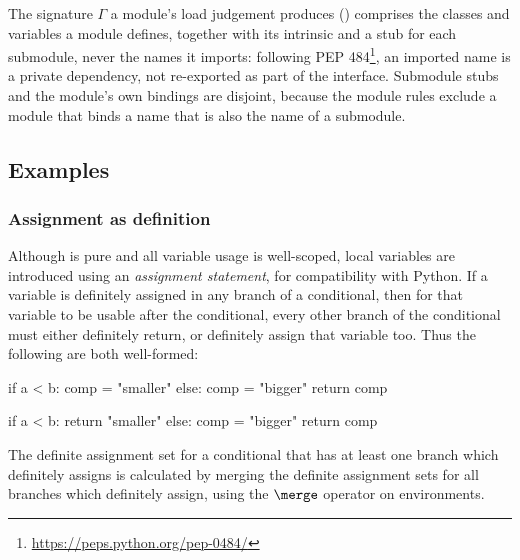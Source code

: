 

The signature $\Gamma$ a module's load judgement produces () comprises the classes
and variables a module defines, together with its intrinsic  and a stub for each submodule,
never the names it imports: following PEP 484\footnote{\url{https://peps.python.org/pep-0484/}}, an imported
name is a private dependency, not re-exported as part of the interface. Submodule stubs and the module's own
bindings are disjoint, because the module rules exclude a module that binds a name that is also the name of
a submodule.

\begin{PaperOnly}
\subsection{Examples}

\subsubsection{Assignment as definition}
\label{sec:assignment-as-definition}

Although \PurePy is pure and all variable usage is well-scoped, local variables are introduced using an
\emph{assignment statement}, for compatibility with Python. If a variable is definitely assigned in any branch
of a conditional, then for that variable to be usable after the conditional, every other branch of the
conditional must either definitely return, or definitely assign that variable too. Thus the following are both
well-formed:

\begin{center}
\begin{minipage}{0.48\textwidth}
\centering
\begin{python}
if a < b:
   comp = "smaller"
else:
   comp = "bigger"
return comp
\end{python}
\end{minipage}
\hfill
\begin{minipage}{0.48\textwidth}
\centering
\begin{python}
if a < b:
   return "smaller"
else:
   comp = "bigger"
return comp
\end{python}
\end{minipage}
\end{center}
\medskip

\noindent The definite assignment set for a conditional that has at least one branch which definitely assigns
is calculated by merging the definite assignment sets for all branches which definitely assign, using the
$\merge$ operator on environments.


\end{PaperOnly}
